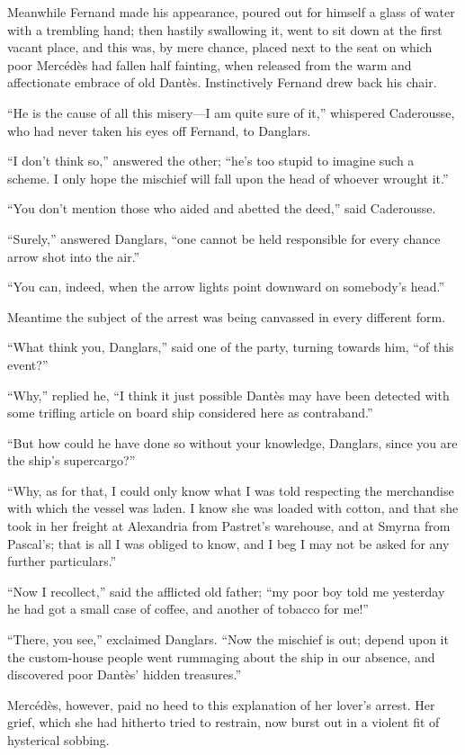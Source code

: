 Meanwhile Fernand made his appearance, poured out for himself a glass
of water with a trembling hand; then hastily swallowing it, went to sit
down at the first vacant place, and this was, by mere chance, placed
next to the seat on which poor Mercédès had fallen half fainting, when
released from the warm and affectionate embrace of old Dantès.
Instinctively Fernand drew back his chair.

“He is the cause of all this misery—I am quite sure of it,” whispered
Caderousse, who had never taken his eyes off Fernand, to Danglars.

“I don’t think so,” answered the other; “he’s too stupid to imagine
such a scheme. I only hope the mischief will fall upon the head of
whoever wrought it.”

“You don’t mention those who aided and abetted the deed,” said
Caderousse.

“Surely,” answered Danglars, “one cannot be held responsible for every
chance arrow shot into the air.”

“You can, indeed, when the arrow lights point downward on somebody’s
head.”

Meantime the subject of the arrest was being canvassed in every
different form.

“What think you, Danglars,” said one of the party, turning towards him,
“of this event?”

“Why,” replied he, “I think it just possible Dantès may have been
detected with some trifling article on board ship considered here as
contraband.”

“But how could he have done so without your knowledge, Danglars, since
you are the ship’s supercargo?”

“Why, as for that, I could only know what I was told respecting the
merchandise with which the vessel was laden. I know she was loaded with
cotton, and that she took in her freight at Alexandria from Pastret’s
warehouse, and at Smyrna from Pascal’s; that is all I was obliged to
know, and I beg I may not be asked for any further particulars.”

“Now I recollect,” said the afflicted old father; “my poor boy told me
yesterday he had got a small case of coffee, and another of tobacco for
me!”

“There, you see,” exclaimed Danglars. “Now the mischief is out; depend
upon it the custom-house people went rummaging about the ship in our
absence, and discovered poor Dantès’ hidden treasures.”

Mercédès, however, paid no heed to this explanation of her lover’s
arrest. Her grief, which she had hitherto tried to restrain, now burst
out in a violent fit of hysterical sobbing.

